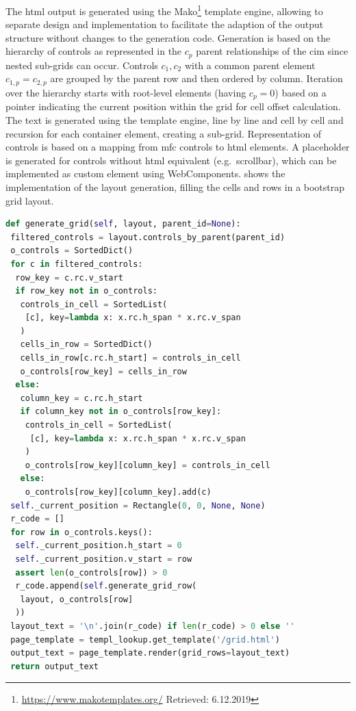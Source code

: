 The \gls{html} output is generated using the Mako\footnote{\url{https://www.makotemplates.org/} Retrieved: 6.12.2019} template engine, allowing to separate design and implementation to facilitate the adaption of the output structure without changes to the generation code.
Generation is based on the hierarchy of controls as represented in the \(c_p\) parent relationships of the \gls{cim} since nested sub-grids can occur.
Controls \(c_1, c_2\) with a common parent element \(c_{1,p}= c_{2,p}\) are grouped by the parent row and then ordered by column.
Iteration over the hierarchy starts with root-level elements (having \(c_p = 0\)) based on a pointer indicating the current position within the grid for cell offset calculation.
The text is generated using the template engine, line by line and cell by cell and recursion for each container element, creating a sub-grid.
Representation of controls is based on a mapping from \gls{mfc} controls to \gls{html} elements.
A placeholder is generated for controls without \gls{html} equivalent (e.g.~scrollbar), which can be implemented as custom element using WebComponents.
 shows the implementation of the layout generation, filling the cells and rows in a bootstrap grid layout.

\begin{lstlisting}[language=Python, captionpos=t, caption=Layout Generation, label=lst:ui-generation]
def generate_grid(self, layout, parent_id=None):
 filtered_controls = layout.controls_by_parent(parent_id)
 o_controls = SortedDict()
 for c in filtered_controls:
  row_key = c.rc.v_start
  if row_key not in o_controls:
   controls_in_cell = SortedList(
    [c], key=lambda x: x.rc.h_span * x.rc.v_span
   )
   cells_in_row = SortedDict()
   cells_in_row[c.rc.h_start] = controls_in_cell
   o_controls[row_key] = cells_in_row
  else:
   column_key = c.rc.h_start
   if column_key not in o_controls[row_key]:
    controls_in_cell = SortedList(
     [c], key=lambda x: x.rc.h_span * x.rc.v_span
    )
    o_controls[row_key][column_key] = controls_in_cell
   else:
    o_controls[row_key][column_key].add(c)
 self._current_position = Rectangle(0, 0, None, None)
 r_code = []
 for row in o_controls.keys():
  self._current_position.h_start = 0
  self._current_position.v_start = row
  assert len(o_controls[row]) > 0 
  r_code.append(self.generate_grid_row(
   layout, o_controls[row]
  ))
 layout_text = '\n'.join(r_code) if len(r_code) > 0 else ''
 page_template = templ_lookup.get_template('/grid.html')
 output_text = page_template.render(grid_rows=layout_text)
 return output_text
\end{lstlisting}


